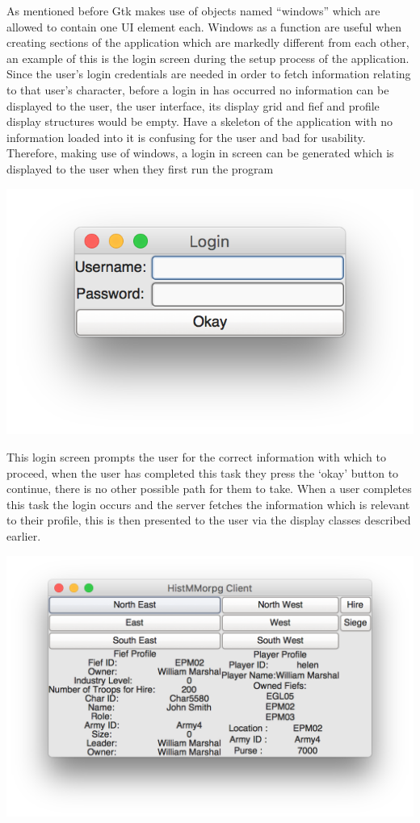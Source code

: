 \documentclass{article}
\begin{document}
As mentioned before Gtk makes use of objects named “windows” which are allowed to contain one UI element each. Windows as a function are useful when creating sections of the application which are markedly different from each other, an example of this is the login screen during the setup process of the application. Since the user's login credentials are needed in order to fetch information relating to that user's character, before a login in has occurred no information can be displayed to the user, the user interface, its display grid and fief and profile display structures would be empty. Have a skeleton of the application with no information loaded into it is confusing for the user and bad for usability. Therefore, making use of windows, a login in screen can be generated which is displayed to the user when they first run the program 
\begin{center}
\includegraphics[scale=1]{gtk1.png}
\end{center}
This login screen prompts the user for the correct information with which to proceed, when the user has completed this task they press the ‘okay’ button to continue, there is no other possible path for them to take. When a user completes this task the login occurs and the server fetches the information which is relevant to their profile, this is then presented to the user via the display classes described earlier.
\begin{center}
	\includegraphics[scale=.8]{gtk2.png}
\end{center}
\end{document}
